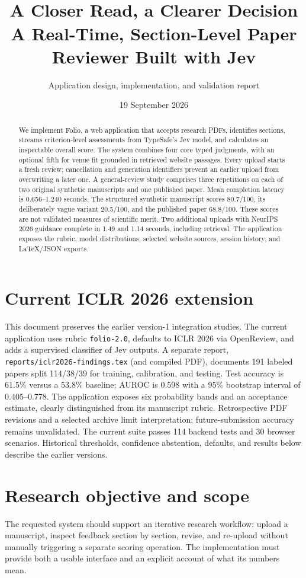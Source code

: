 \documentclass[11pt]{article}
\title{\vspace{-1.0cm}{\color{copper}\large FOLIO / RESEARCH ENGINEERING}\vspace{0.3cm}\\
\Huge A Closer Read, a Clearer Decision\\[0.3cm]
\Large A Real-Time, Section-Level Paper Reviewer Built with Jev}
\author{Application design, implementation, and validation report}
\date{19 September 2026}
\begin{document}
\maketitle
\begin{abstract}
We implement Folio, a web application that accepts research PDFs, identifies sections, streams criterion-level assessments from TypeSafe's Jev model, and calculates an inspectable overall score. The system combines four core typed judgments, with an optional fifth for venue fit grounded in retrieved website passages. Every upload starts a fresh review; cancellation and generation identifiers prevent an earlier upload from overwriting a later one. A general-review study comprises three repetitions on each of two original synthetic manuscripts and one published paper. Mean completion latency is 0.656--1.240 seconds. The structured synthetic manuscript scores 80.7/100, its deliberately vague variant 20.5/100, and the published paper 68.8/100. These scores are not validated measures of scientific merit. Two additional uploads with NeurIPS 2026 guidance complete in 1.49 and 1.14 seconds, including retrieval. The application exposes the rubric, model distributions, selected website sources, session history, and LaTeX/JSON exports.
\end{abstract}

\section*{Current ICLR 2026 extension}
This document preserves the earlier version-1 integration studies. The current application uses rubric \texttt{folio-2.0}, defaults to ICLR 2026 via OpenReview, and adds a supervised classifier of Jev outputs. A separate report, \texttt{reports/iclr2026-findings.tex} (and compiled PDF), documents 191 labeled papers split 114/38/39 for training, calibration, and testing. Test accuracy is 61.5\% versus a 53.8\% baseline; AUROC is 0.598 with a 95\% bootstrap interval of 0.405--0.778. The application exposes six probability bands and an acceptance estimate, clearly distinguished from its manuscript rubric. Retrospective PDF revisions and a selected archive limit interpretation; future-submission accuracy remains unvalidated. The current suite passes 114 backend tests and 30 browser scenarios. Historical thresholds, confidence abstention, defaults, and results below describe the earlier versions.

\section{Research objective and scope}
The requested system should support an iterative research workflow: upload a manuscript, inspect feedback section by section, revise, and re-upload without manually triggering a separate scoring operation. The implementation must provide both a usable interface and an explicit account of what its numbers mean.
\end{document}
